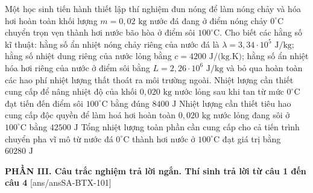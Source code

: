 \begin{ex}%
	Một học sinh tiến hành thiết lập thí nghiệm đun nóng để làm nóng chảy và hóa hơi hoàn toàn khối lượng $m = 0,02\text{ kg}$ nước đá đang ở điểm nóng chảy $0^\circ\text{C}$ chuyển trọn vẹn thành hơi nước bão hòa ở điểm sôi $100^\circ\text{C}$. Cho biết các hằng số kĩ thuật: hằng số ẩn nhiệt nóng chảy riêng của nước đá là $\lambda = 3,34 \cdot 10^5\text{ J/kg}$; hằng số nhiệt dung riêng của nước lỏng bằng $c = 4200\text{ J/(kg.K)}$; hằng số ẩn nhiệt hóa hơi riêng của nước ở điểm sôi bằng $L = 2,26 \cdot 10^6\text{ J/kg}$ và bỏ qua hoàn toàn các hao phí nhiệt lượng thất thoát ra môi trường ngoài.
	{\True Nhiệt lượng cần thiết cung cấp để nâng nhiệt độ của khối $0,020\text{ kg}$ nước lỏng sau khi tan từ mức $0^\circ\text{C}$ đạt tiến đến điểm sôi $100^\circ\text{C}$ bằng đúng $8400\text{ J}$}
	{Nhiệt lượng cần thiết tiêu hao cung cấp độc quyền để làm hoá hơi hoàn toàn $0,020\text{ kg}$ nước lỏng đang sôi ở $100^\circ\text{C}$ bằng $42500\text{ J}$}
	{\True Tổng nhiệt lượng toàn phần cần cung cấp cho cả tiến trình chuyển pha vĩ mô từ nước đá $0^\circ\text{C}$ thành hơi nước ở $100^\circ\text{C}$ đạt giá trị bằng $60280\text{ J}$}
\end{ex}


\noindent \textbf{PHẦN III. Câu trắc nghiệm trả lời ngắn. Thí sinh trả lời từ câu 1 đến câu 4}
[ans/ansSA-BTX-101]

